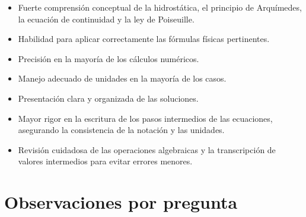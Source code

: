 \documentclass[11pt,a4paper]{article}
\begin{document}
\vspace{4pt}
\begin{minipage}[t]{0.48\linewidth}
  \begin{tcolorbox}[cajaFortaleza, title={Fortalezas}]
\begin{itemize}[leftmargin=1.5em, itemsep=2pt]
  \item Fuerte comprensión conceptual de la hidrostática, el principio de Arquímedes, la ecuación de continuidad y la ley de Poiseuille.
  \item Habilidad para aplicar correctamente las fórmulas físicas pertinentes.
  \item Precisión en la mayoría de los cálculos numéricos.
  \item Manejo adecuado de unidades en la mayoría de los casos.
  \item Presentación clara y organizada de las soluciones.
\end{itemize}
  \end{tcolorbox}
\end{minipage}
\hfill
\begin{minipage}[t]{0.48\linewidth}
  \begin{tcolorbox}[cajaMejora, title={Areas de mejora}]
\begin{itemize}[leftmargin=1.5em, itemsep=2pt]
  \item Mayor rigor en la escritura de los pasos intermedios de las ecuaciones, asegurando la consistencia de la notación y las unidades.
  \item Revisión cuidadosa de las operaciones algebraicas y la transcripción de valores intermedios para evitar errores menores.
\end{itemize}
  \end{tcolorbox}
\end{minipage}

\section*{Observaciones por pregunta}
\end{document}
